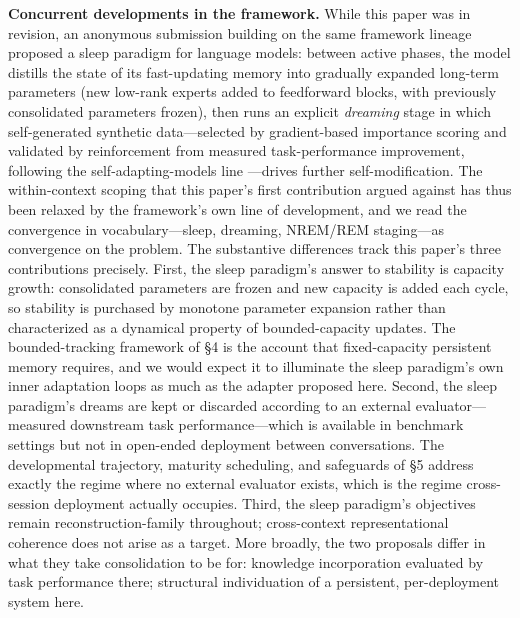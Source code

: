\documentclass[11pt]{article}
\begin{document}
\textbf{Concurrent developments in the framework.} While this paper was in revision, an anonymous submission building on the same framework lineage \cite{anonymous2026sleep} proposed a sleep paradigm for language models: between active phases, the model distills the state of its fast-updating memory into gradually expanded long-term parameters (new low-rank experts added to feedforward blocks, with previously consolidated parameters frozen), then runs an explicit \emph{dreaming} stage in which self-generated synthetic data---selected by gradient-based importance scoring and validated by reinforcement from measured task-performance improvement, following the self-adapting-models line \cite{zweiger2025seal}---drives further self-modification. The within-context scoping that this paper's first contribution argued against has thus been relaxed by the framework's own line of development, and we read the convergence in vocabulary---sleep, dreaming, NREM/REM staging---as convergence on the problem. The substantive differences track this paper's three contributions precisely. First, the sleep paradigm's answer to stability is capacity growth: consolidated parameters are frozen and new capacity is added each cycle, so stability is purchased by monotone parameter expansion rather than characterized as a dynamical property of bounded-capacity updates. The bounded-tracking framework of \S 4 is the account that fixed-capacity persistent memory requires, and we would expect it to illuminate the sleep paradigm's own inner adaptation loops as much as the adapter proposed here. Second, the sleep paradigm's dreams are kept or discarded according to an external evaluator---measured downstream task performance---which is available in benchmark settings but not in open-ended deployment between conversations. The developmental trajectory, maturity scheduling, and safeguards of \S 5 address exactly the regime where no external evaluator exists, which is the regime cross-session deployment actually occupies. Third, the sleep paradigm's objectives remain reconstruction-family throughout; cross-context representational coherence does not arise as a target. More broadly, the two proposals differ in what they take consolidation to be for: knowledge incorporation evaluated by task performance there; structural individuation of a persistent, per-deployment system here.
\end{document}
